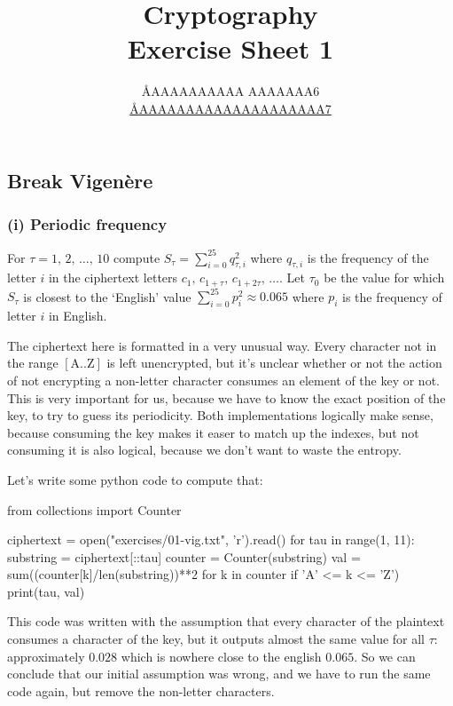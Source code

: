 \documentclass{article}
\title{Cryptography \\ Exercise Sheet 1}
\author{
  \AA{AAAAAAAAAA AAAAAAA}{6} \\
  \href{mailto:\AA{AAAAAAAAAAAAAAAAAAAA}{7}}{\AA{AAAAAAAAAAAAAAAAAAAA}{7}}
}
\begin{document}
  \maketitle

  \setcounter{section}{1}
  \subsection{Break Vigenère}
  \subsubsection*{(i) Periodic frequency}
  \begin{centerframebox}
    For $\tau = 1,\, 2,\, \dots,\, 10$ compute $S_\tau = \sum_{i=0}^{25} q^2_{\tau,i}$
    where $q_{\tau,i}$ is the frequency of the letter $i$ in the ciphertext letters $c_1,\, c_{1+\tau},\, c_{1+2\tau},\, \dots$.
    Let $\tau_0$ be the value for which $S_\tau$ is closest to the `English' value $\sum_{i=0}^{25} p_i^2 \approx 0.065$
    where $p_i$ is the frequency of letter $i$ in English.
  \end{centerframebox}
  The ciphertext here is formatted in a very unusual way.
  Every character not in the range $[\text{A} .. \text{Z}]$ is left unencrypted,
  but it's unclear whether or not the action of not encrypting a non-letter character consumes an element of the key or not.
  This is very important for us, because we have to know the exact position of the key, to try to guess its periodicity.
  Both implementations logically make sense, because consuming the key makes it easer to match up the indexes,
  but not consuming it is also logical, because we don't want to waste the entropy.

  Let's write some python code to compute that:
  \begin{mylisting}
    from collections import Counter

    ciphertext = open("exercises/01-vig.txt", 'r').read()
    for tau in range(1, 11):
      substring = ciphertext[::tau]
      counter = Counter(substring)
      val = sum((counter[k]/len(substring))**2 for k in counter if 'A' <= k <= 'Z')
      print(tau, val)
  \end{mylisting}
  This code was written with the assumption that every character of the plaintext consumes a character of the key,
  but it outputs almost the same value for all $\tau$: approximately $0.028$ which is nowhere close to the english $0.065$.
  So we can conclude that our initial assumption was wrong, and we have to run the same code again, but remove the non-letter characters.
\end{document}
